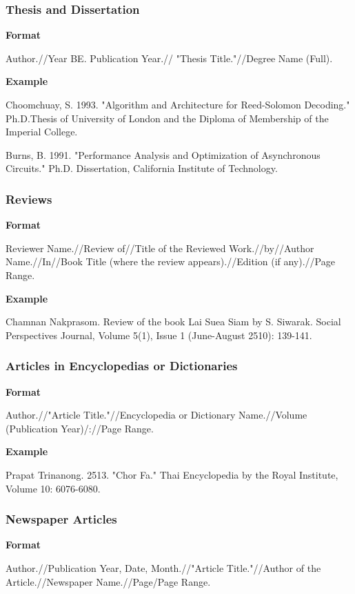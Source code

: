\subsubsection{Thesis and Dissertation}

\textbf{Format}

Author.//Year BE. Publication Year.// "Thesis Title."//Degree Name (Full).

\textbf{Example}

Choomchuay, S. 1993. "Algorithm and Architecture for Reed-Solomon Decoding." Ph.D.Thesis of University of London and the Diploma of Membership of the Imperial College.

Burns, B. 1991. "Performance Analysis and Optimization of Asynchronous Circuits." Ph.D. Dissertation, California Institute of Technology.

\subsubsection{Reviews}

\textbf{Format}

Reviewer Name.//Review of//Title of the Reviewed Work.//by//Author Name.//In//Book Title (where the review appears).//Edition (if any).//Page Range.

\textbf{Example}

Chamnan Nakprasom. Review of the book Lai Suea Siam by S. Siwarak. Social Perspectives Journal, Volume 5(1), Issue 1 (June-August 2510): 139-141.

\subsubsection{Articles in Encyclopedias or Dictionaries}

\textbf{Format}

Author.//"Article Title."//Encyclopedia or Dictionary Name.//Volume (Publication Year)/://Page Range.

\textbf{Example}

Prapat Trinanong. 2513. "Chor Fa." Thai Encyclopedia by the Royal Institute, Volume 10: 6076-6080.

\subsubsection{Newspaper Articles}

\textbf{Format}

Author.//Publication Year, Date, Month.//"Article Title."//Author of the Article.//Newspaper Name.//Page/Page Range.

